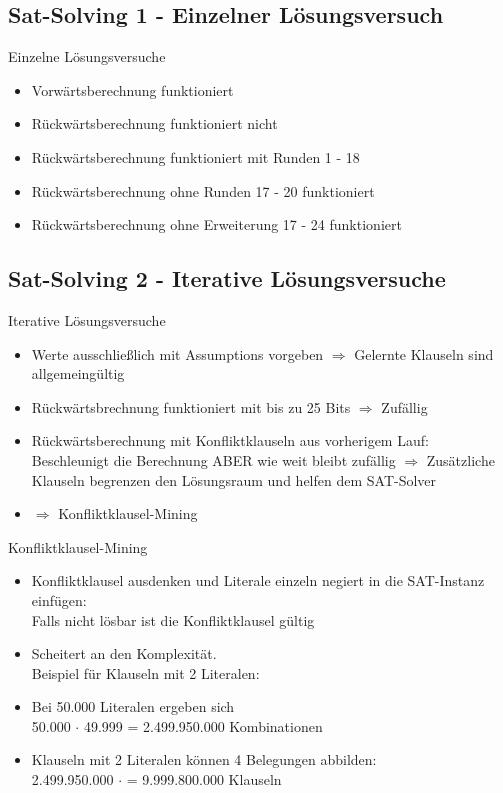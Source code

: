 \documentclass{beamer}
\begin{document}
  \subsection{Sat-Solving 1 - Einzelner Lösungsversuch}
    \begin{frame}{Einzelne Lösungsversuche}
      \begin{itemize}
        \setlength{\itemsep}{20pt}
        \item Vorwärtsberechnung funktioniert
        \item Rückwärtsberechnung funktioniert nicht
        \item Rückwärtsberechnung funktioniert mit Runden 1 - 18
        \item Rückwärtsberechnung ohne Runden 17 - 20 funktioniert
        \item Rückwärtsberechnung ohne Erweiterung 17 - 24 funktioniert
      \end{itemize}
    \end{frame}
  \subsection{Sat-Solving 2 - Iterative Lösungsversuche}
    \begin{frame}{Iterative Lösungsversuche}
      \begin{itemize}
        \item Werte ausschließlich mit Assumptions vorgeben\newline
        $ \Rightarrow $ Gelernte Klauseln sind allgemeingültig
        \item Rückwärtsbrechnung funktioniert mit bis zu 25 Bits $ \Rightarrow $ Zufällig
        \item Rückwärtsberechnung mit Konfliktklauseln aus vorherigem Lauf:\\Beschleunigt die Berechnung ABER wie weit bleibt zufällig\newline
        $ \Rightarrow $ Zusätzliche Klauseln begrenzen den Lösungsraum und helfen dem SAT-Solver
        \item $ \Rightarrow $ Konfliktklausel-Mining
      \end{itemize}
    \end{frame}
    \begin{frame}{Konfliktklausel-Mining}
      \begin{itemize}
       \item Konfliktklausel ausdenken und Literale einzeln negiert in die SAT-Instanz einfügen:\\Falls nicht lösbar ist die Konfliktklausel gültig
       \item Scheitert an den Komplexität.\\Beispiel für Klauseln mit 2 Literalen:
       \item Bei 50.000 Literalen ergeben sich\\ 50.000 $ \cdot $ 49.999 = 2.499.950.000 Kombinationen
       \item Klauseln mit 2 Literalen können 4 Belegungen abbilden:\\ 2.499.950.000 $ \cdot $ = 9.999.800.000 Klauseln
      \end{itemize}
    \end{frame}
\end{document}
